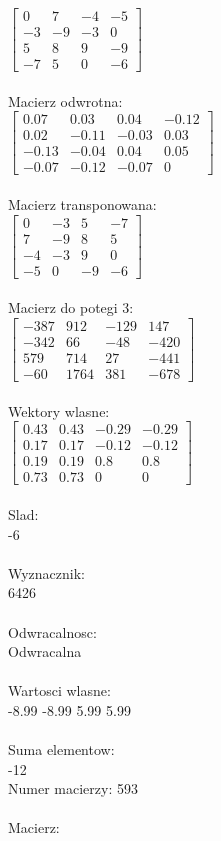 \documentclass[a4paper,12pt]{article}
\begin{document}
$\begin{bmatrix} 0&7&-4&-5\\-3&-9&-3&0\\5&8&9&-9\\-7&5&0&-6 \end{bmatrix}$
\\
\\
Macierz odwrotna:\\

$\begin{bmatrix} 0.07&0.03&0.04&-0.12\\0.02&-0.11&-0.03&0.03\\-0.13&-0.04&0.04&0.05\\-0.07&-0.12&-0.07&0 \end{bmatrix}$
\\
\\
Macierz transponowana:\\

$\begin{bmatrix} 0&-3&5&-7\\7&-9&8&5\\-4&-3&9&0\\-5&0&-9&-6 \end{bmatrix}$
\\
\\
Macierz do potegi 3:\\

$\begin{bmatrix} -387&912&-129&147\\-342&66&-48&-420\\579&714&27&-441\\-60&1764&381&-678 \end{bmatrix}$
\\
\\
Wektory wlasne:\\

$\begin{bmatrix} 0.43&0.43&-0.29&-0.29\\0.17&0.17&-0.12&-0.12\\0.19&0.19&0.8&0.8\\0.73&0.73&0&0 \end{bmatrix}$
\\
\\
Slad:\\
-6
\\
\\
Wyznacznik:\\
6426
\\
\\
Odwracalnosc:\\
Odwracalna
\\
\\
Wartosci wlasne:\\
-8.99 -8.99 5.99 5.99
\\
\\
Suma elementow:\\
-12
\\
\newpage
Numer macierzy:
593
\\
\\
Macierz:\\
\end{document}
